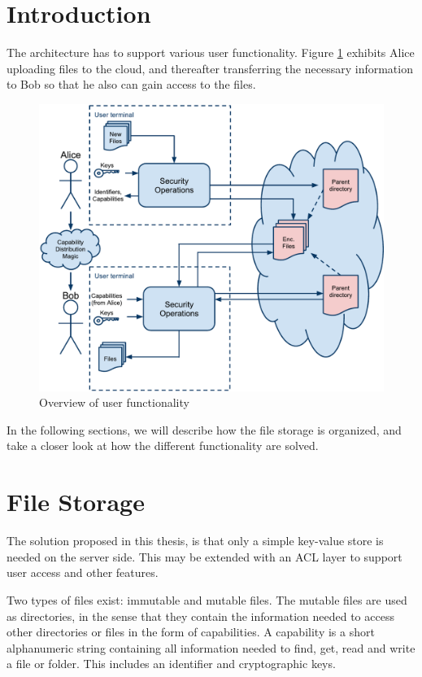 \documentclass[pdftex,english,10pt,b5paper,twoside]{book}
\begin{document}
\section{Introduction}

The architecture has to support various user functionality. Figure
\ref{fig:AS:overview} exhibits Alice uploading files to the cloud, and
thereafter transferring the necessary information to Bob so that he also can
gain access to the files.

\begin{figure}[h!]
    \centering
    \includegraphics[width=\columnwidth]{ArchitectureOverview.pdf}
    \caption{Overview of user functionality}
    \label{fig:AS:overview}
\end{figure}

In the following sections, we will describe how the file storage is organized,
and take a closer look at how the different functionality are solved.

\section{File Storage}
\label{sec:AS:FS}

The solution proposed in this thesis, is that only a simple key-value store is
needed on the server side. This may be extended with an \ac{ACL} layer to
support user access and other features.

Two types of files exist: immutable and mutable files. The mutable files are used
as directories, in the sense that they contain the information needed to access
other directories or files in the form of capabilities.
A capability is a short alphanumeric string containing all information needed
to find, get, read and write a file or folder. This includes an identifier and
cryptographic keys.
\end{document}

